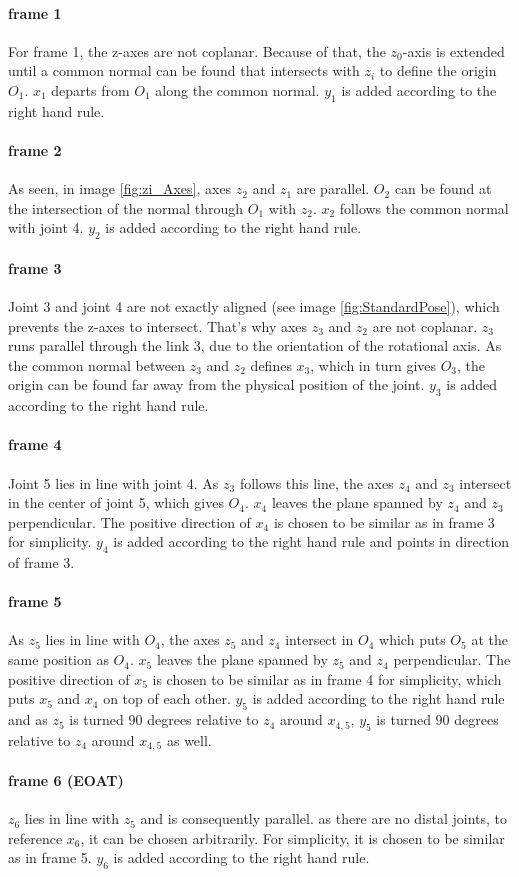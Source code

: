 \paragraph{frame 1}
For frame 1, the z-axes are not coplanar. 
Because of that, the  $z_0$-axis is extended until a common normal can be found that intersects with $z_i$ to define the origin $O_1$.
$x_1$ departs from $O_1$ along the common normal.
$y_1$ is added according to the right hand rule.

\paragraph{frame 2}
As seen, in image \ref{fig:zi_Axes}, axes $z_2$ and $z_1$ are parallel. $O_2$ can be found at the intersection of the normal through $O_1$ with $z_2$. $x_2$ follows the common normal with joint 4.
$y_2$ is added according to the right hand rule.

\paragraph{frame 3}
Joint 3 and joint 4 are not exactly aligned (see image \ref{fig:StandardPose}), which prevents the z-axes to intersect. That's why axes $z_3$ and $z_2$ are not coplanar. 
$z_3$ runs parallel through the link 3, due to the orientation of the rotational axis.
As the common normal between $z_3$ and $z_2$ defines $x_3$, which in turn gives $O_3$, the origin can be found far away from the physical position of the joint.
$y_3$ is added according to the right hand rule.

\paragraph{frame 4}
Joint 5 lies in line with joint 4.
As $z_3$ follows this line, the axes  $z_4$ and $z_3$ intersect in the center of joint 5, which gives $O_4$. 
$x_4$ leaves the plane spanned by  $z_4$ and $z_3$ perpendicular.
The positive direction of $x_4$ is chosen to be similar as in frame 3 for simplicity.
$y_4$ is added according to the right hand rule and points in direction of frame 3.

\paragraph{frame 5}
As $z_5$ lies  in line with $O_4$, the axes  $z_5$ and $z_4$ intersect in $O_4$ which puts $O_5$ at the same position as $O_4$.
$x_5$ leaves the plane spanned by  $z_5$ and $z_4$ perpendicular.
The positive direction of $x_5$ is chosen to be similar as in frame 4 for simplicity, which puts $x_5$ and $x_4$ on top of each other. 
$y_5$ is added according to the right hand rule and as $z_5$ is turned 90 degrees relative to $z_4$ around $x_{4,5}$, $y_5$ is turned 90 degrees relative to $z_4$ around $x_{4,5}$ as well.

\paragraph{frame 6 (EOAT)}
$z_6$ lies in line with $z_5$ and is consequently parallel.
as there are no distal joints, to reference $x_6$, it can be chosen arbitrarily. 
For simplicity, it is chosen to be similar as in frame 5. 
$y_6$ is added according to the right hand rule.






